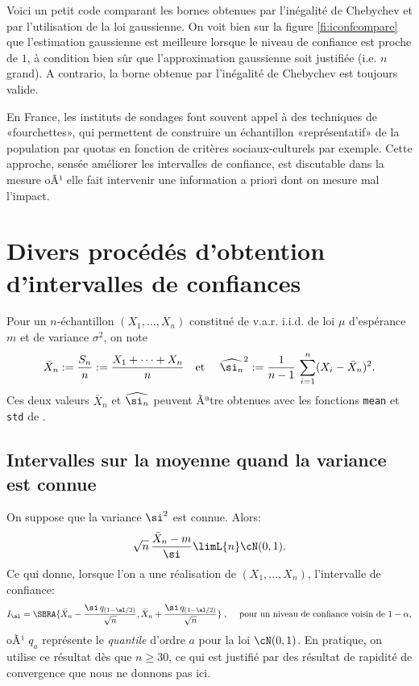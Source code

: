 Voici un petit code \ML{} comparant les bornes obtenues par l'inégalité de
Chebychev et par l'utilisation de la loi gaussienne. On voit bien sur la
figure \ref{fi:iconfcompare} que l'estimation gaussienne est meilleure
lorsque le niveau de confiance est proche de $1$, à condition bien sûr que
l'approximation gaussienne soit justifiée (i.e. $n$ grand). A contrario, la
borne obtenue par l'inégalité de Chebychev est toujours valide.

%
%
%

\begin{remark}
  En France, les instituts de sondages font souvent appel à des techniques de
  «fourchettes», qui permettent de construire un échantillon «représentatif»
  de la population par quotas en fonction de critères sociaux-culturels par
  exemple.  Cette approche, sensée améliorer les intervalles de confiance, est
  discutable dans la mesure oÃ¹ elle fait intervenir une information a priori
  dont on mesure mal l'impact.
\end{remark}

%
\section{Divers procédés d'obtention d'intervalles de confiances}
%

Pour un $n$-échantillon $(X_1,\ldots,X_n)$ constitué de v.a.r. i.i.d. de loi
$\mu$ d'espérance $m$ et de variance $\sigma^2$, on note
$$
\bar{X}_n := \frac{S_n}{n}:=\frac{X_1+\cdots+X_n}{n} 
\text{\quad et \quad}
\widehat{\si_n}^2:=\frac{1}{n-1}\,\sum_{i=1}^n (X_i-\bar{X}_n)^2.
$$
Ces deux valeurs $\bar{X}_n$ et $\widehat{\si_n}$ peuvent Ãªtre obtenues avec
les fonctions \texttt{mean} et \texttt{std} de \ML.

%
\subsection{Intervalles sur la moyenne quand la variance est connue} 
%

On suppose que la variance $\si^2$ est connue. Alors:
$$
\sqrt{n}\,\frac{\bar{X}_n -m}{\si} \limL{n} \cN(0,1).
$$
Ce qui donne, lorsque l'on a une réalisation de $(X_1,\ldots,X_n)$,
l'intervalle de confiance:
$$
I_\al=\SBRA{\bar{X}_n-\frac{\si \, q_{(1-\al/2)}}{\sqrt{n}},
  \bar{X}_n+\frac{\si \, q_{(1-\al/2)}}{\sqrt{n}}} \;,\;
\text{\quad pour un niveau de confiance voisin de $1-\alpha$},  
$$
oÃ¹ $q_a$ représente le \emph{quantile} d'ordre $a$ pour la loi $\cN(0,1)$.
En pratique, on utilise ce résultat dès que $n \geq 30$, ce qui est justifié
par des résultat de rapidité de convergence que nous ne donnons pas ici.

